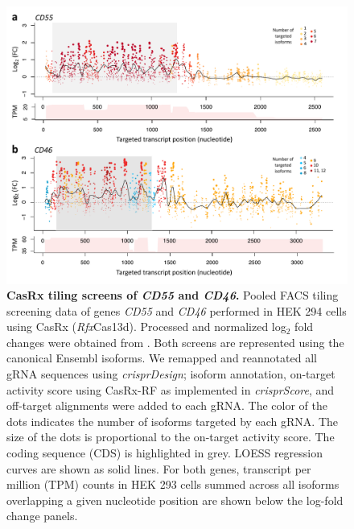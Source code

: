 \documentclass[pdftex,english,10pt]{article}
\begin{document}
{%
\begin{figure}
\centering
\includegraphics[width=01\textwidth]{analyses/casrx/sanjana//figures/casrx_supp_long.pdf}
  \caption{\textbf{CasRx tiling screens of \textit{CD55} and \textit{CD46}.}
Pooled FACS tiling screening data of genes \textit{CD55} and \textit{CD46} performed in HEK 294 cells using CasRx (\textit{Rfx}Cas13d). Processed and normalized log$_2$ fold changes were obtained from \citet{wessels2020massively}. Both screens are represented using the canonical Ensembl isoforms.  We remapped and reannotated all gRNA sequences using \textit{crisprDesign}; isoform annotation, on-target activity score using CasRx-RF as implemented in \textit{crisprScore}, and off-target alignments were added to each gRNA. The color of the dots indicates the number of isoforms targeted by each gRNA. The size of the dots is proportional to the on-target activity score. The coding sequence (CDS) is highlighted in grey. LOESS regression curves are shown as solid lines. For both genes, transcript per million (TPM) counts in HEK 293 cells summed across all isoforms overlapping a given nucleotide position are shown below the log-fold change panels.
}
  \label{suppfig:casrxlong}
\end{figure}


}
\end{document}

